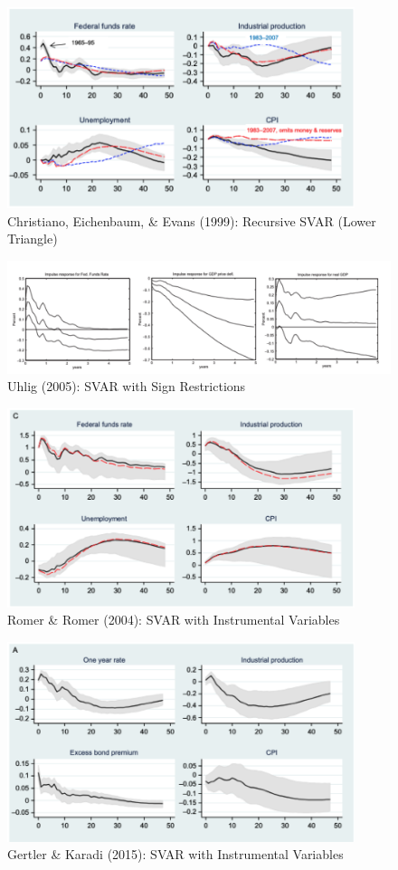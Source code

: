             \begin{figure}[H]
                \centering
                \includegraphics[width=4in]{images/ch8/mp_christiano.png}
                \caption{Christiano, Eichenbaum, \& Evans (1999): Recursive SVAR (Lower Triangle)}
            \end{figure}
            \begin{figure}[H]
                \centering
                \includegraphics[width=5in]{images/ch8/mp_Uhlig.png}
                \caption{Uhlig (2005): SVAR with Sign Restrictions}
            \end{figure}
            \begin{figure}[H]
                \centering
                \includegraphics[width=4in]{images/ch8/mp_Romer.png}
                \caption{Romer \& Romer (2004): SVAR with Instrumental Variables}
            \end{figure}
            \begin{figure}[H]
                \centering
                \includegraphics[width=4in]{images/ch8/mp_Gertler.png}
                \caption{Gertler \& Karadi (2015): SVAR with Instrumental Variables}
            \end{figure}
